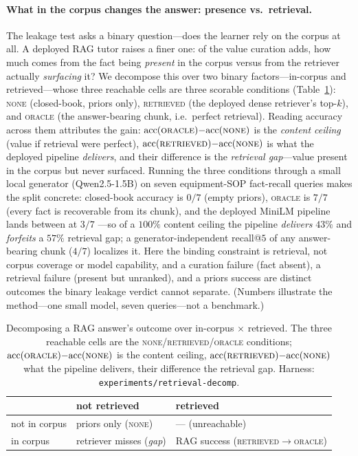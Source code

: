 \documentclass{article}
\begin{document}
\paragraph{What in the corpus changes the answer: presence vs.\ retrieval.}
The leakage test asks a binary question---does the learner rely on the corpus at all. A
deployed RAG tutor raises a finer one: of the value curation adds, how much comes from the
fact being \emph{present} in the corpus versus from the retriever actually \emph{surfacing}
it? We decompose this over two binary factors---in-corpus and retrieved---whose three
reachable cells are three scorable conditions (Table~\ref{tab:ragdecomp}):
\textsc{none} (closed-book, priors only), \textsc{retrieved} (the deployed dense
retriever's top-$k$), and \textsc{oracle} (the answer-bearing chunk, i.e.\ perfect
retrieval). Reading accuracy across them attributes the gain:
$\mathrm{acc}(\textsc{oracle}){-}\mathrm{acc}(\textsc{none})$ is the \emph{content ceiling}
(value if retrieval were perfect), $\mathrm{acc}(\textsc{retrieved}){-}\mathrm{acc}(\textsc{none})$
is what the deployed pipeline \emph{delivers}, and their difference is the \emph{retrieval
gap}---value present in the corpus but never surfaced. Running the three conditions through
a small local generator (Qwen2.5-1.5B) on seven equipment-SOP fact-recall queries makes the
split concrete: closed-book accuracy is $0/7$ (empty priors), \textsc{oracle} is $7/7$ (every
fact is recoverable from its chunk), and the deployed MiniLM pipeline lands between at $3/7$
---so of a $100\%$ content ceiling the pipeline \emph{delivers} $43\%$ and \emph{forfeits} a
$57\%$ retrieval gap; a generator-independent recall@$5$ of any answer-bearing chunk ($4/7$)
localizes it. Here the binding constraint is retrieval, not corpus coverage or model
capability, and a curation failure (fact absent), a retrieval failure (present but unranked),
and a priors success are distinct outcomes the binary leakage verdict cannot separate.
(Numbers illustrate the method---one small model, seven queries---not a benchmark.)

\begin{table}[t]
\centering
\small
\begin{tabular}{lll}
\toprule
 & not retrieved & retrieved \\
\midrule
not in corpus & priors only (\textsc{none}) & --- (unreachable) \\
in corpus     & retriever misses (\emph{gap}) & RAG success (\textsc{retrieved}$\to$\textsc{oracle}) \\
\bottomrule
\end{tabular}
\caption{Decomposing a RAG answer's outcome over in-corpus $\times$ retrieved. The three
reachable cells are the \textsc{none}/\textsc{retrieved}/\textsc{oracle} conditions;
$\mathrm{acc}(\textsc{oracle}){-}\mathrm{acc}(\textsc{none})$ is the content ceiling,
$\mathrm{acc}(\textsc{retrieved}){-}\mathrm{acc}(\textsc{none})$ what the pipeline delivers,
their difference the retrieval gap. Harness: \texttt{experiments/retrieval-decomp}.}
\label{tab:ragdecomp}
\end{table}
\end{document}
